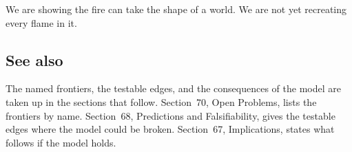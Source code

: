 \begin{principle}
We are showing the fire can take the shape of a world. We are not yet recreating every flame in it.
\end{principle}

\subsection{See also}

The named frontiers, the testable edges, and the consequences of the model are taken up in the sections that follow. Section~70, Open Problems, lists the frontiers by name. Section~68, Predictions and Falsifiability, gives the testable edges where the model could be broken. Section~67, Implications, states what follows if the model holds.
